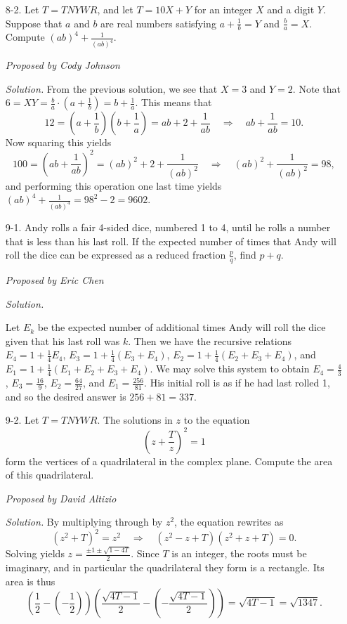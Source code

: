 \documentclass[10pt]{article}
\newcommand{\proposed}[1]
{
\vspace{5pt}
\noindent\textit{Proposed by #1}
}
\newcommand{\solution}
{
\vspace{5pt}
\noindent\textit{Solution.}\qquad
}
\begin{document}
\begin{enumerate}
\item[8-2.] Let $T = TNYWR$, and let $T = 10X + Y$ for an integer $X$ and a digit $Y$. Suppose that $a$ and $b$ are real numbers satisfying $a+\frac1b=Y$ and $\frac{b}a=X$. Compute $(ab)^4+\frac1{(ab)^4}$.

\proposed{Cody Johnson}

\solution From the previous solution, we see that $X = 3$ and $Y = 2$.  Note that $6 = XY = \tfrac ba\cdot (a+\tfrac1b) = b + \tfrac1a$.  This means that \[12 = \left(a + \frac1b\right)\left(b+\frac1a\right) = ab + 2 + \frac 1{ab}\quad\Rightarrow\quad ab + \frac 1{ab} = 10.\] Now squaring this yields \[100 = \left(ab + \frac{1}{ab}\right)^2 = (ab)^2 + 2 + \frac{1}{(ab)^2}\quad\Rightarrow\quad (ab)^2 + \frac{1}{(ab)^2} = 98,\] and performing this operation one last time yields $(ab)^4 + \tfrac{1}{(ab)^4} = 98^2 - 2 = \boxed{9602}$.

\item[9-1.] Andy rolls a fair 4-sided dice, numbered 1 to 4, until he rolls a number that is less than his last roll. If the expected number of times that Andy will roll the dice can be expressed as a reduced fraction $\frac{p}{q}$, find $p + q$.

\proposed{Eric Chen}

\solution
Let $E_k$ be the expected number of additional times Andy will roll the dice given that his last roll was $k$. Then we have the recursive relations $E_4 = 1 + \frac14 E_4$, $E_3 = 1 + \frac14 (E_3 + E_4)$, $E_2 = 1 + \frac14 (E_2 + E_3 + E_4)$, and $E_1 = 1 + \frac14 (E_1 + E_2 + E_3 + E_4)$. We may solve this system to obtain $E_4 = \frac{4}{3}$, $E_3 = \frac{16}{9}$, $E_2 = \frac{64}{27}$, and $E_1 = \frac{256}{81}$. His initial roll is as if he had last rolled 1, and so the desired answer is $256+81=\boxed{337}$.


\item[9-2.] Let $T = TNYWR$. The solutions in $z$ to the equation \[\left(z + \frac Tz\right)^2 = 1\] form the vertices of a quadrilateral in the complex plane.  Compute the area of this quadrilateral.

\proposed{David Altizio}

\solution By multiplying through by $z^2$, the equation rewrites as \[(z^2 + T)^2 = z^2\quad\Rightarrow\quad (z^2 - z + T)(z^2 + z + T) = 0.\] Solving yields $z = \tfrac{\pm 1\pm \sqrt{1-4T}}2$.  Since $T$ is an integer, the roots must be imaginary, and in particular the quadrilateral they form is a rectangle.  Its area is thus \[\left(\frac 12 - \left(-\frac12\right)\right)\left(\frac{\sqrt{4T-1}}2 - \left(-\frac{\sqrt{4T-1}}2\right)\right) = \sqrt{4T-1} = \boxed{\sqrt{1347}}.\]


\end{enumerate}
\end{document}
